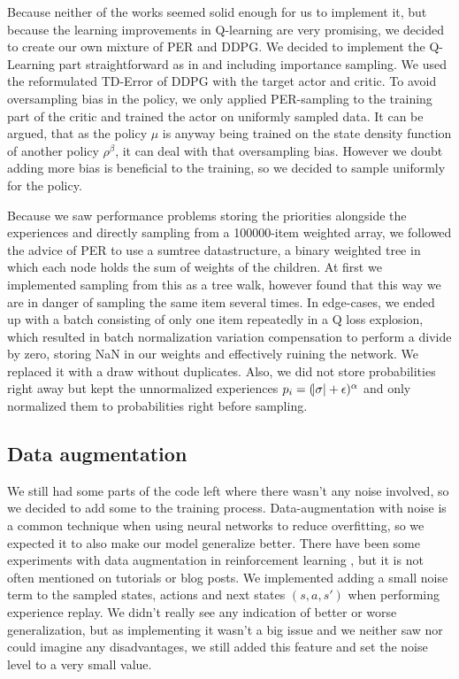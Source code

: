 \documentclass[hyperref,final,beleg]{cgvpub}
\begin{document}
Because neither of the works seemed solid enough for us to implement it, but because the learning improvements in Q-learning are very promising, we decided to create our own mixture of \ac{PER} and \ac{DDPG}. We decided to implement the Q-Learning part straightforward as in \cite{schaulPrioritizedExperienceReplay2016} and including importance sampling. We used the reformulated \ac{TD-Error} of \ac{DDPG} with the target actor and critic. To avoid oversampling bias in the policy, we only applied \ac{PER}-sampling to the training part of the critic and trained the actor on uniformly sampled data. It can be argued, that as the policy $\mu$ is anyway being trained on the state density function of another policy $\rho^{\beta}$, it can deal with that oversampling bias. However we doubt adding more bias is beneficial to the training, so we decided to sample uniformly for the policy.

Because we saw performance problems storing the priorities alongside the experiences and directly sampling from a 100000-item weighted array, we followed the advice of \ac{PER} to use a sumtree datastructure, a binary weighted tree in which each node holds the sum of weights of the children. At first we implemented sampling from this as a tree walk, however found that this way we are in danger of sampling the same item several times. In edge-cases, we ended up with a batch consisting of only one item repeatedly in a Q loss explosion, which resulted in batch normalization variation compensation to perform a divide by zero, storing NaN in our weights and effectively ruining the network. We replaced it with a draw without duplicates. Also, we did not store probabilities right away but kept the unnormalized experiences $p_i = (\abs{\sigma} + \epsilon)^{\alpha}$ and only normalized them to probabilities right before sampling.

\subsection{Data augmentation}

We still had some parts of the code left where there wasn't any noise involved, so we decided to add some to the training process. Data-augmentation with noise is a common technique when using neural networks \cite[p.347]{bishopNeuralNetworksPattern1995} to reduce overfitting, so we expected it to also make our model generalize better. There have been some experiments with data augmentation in reinforcement learning \cite{cobbeQuantifyingGeneralizationReinforcement2019}, but it is not often mentioned on tutorials or blog posts. We implemented adding a small noise term to the sampled states, actions and next states \((s, a, s')\) when performing experience replay. We didn't really see any indication of better or worse generalization, but as implementing it wasn't a big issue and we neither saw nor could imagine any disadvantages, we still added this feature and set the noise level to a very small value.
\end{document}
